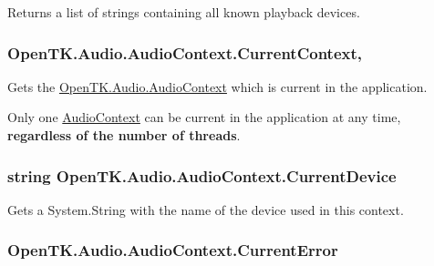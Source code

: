 Returns a list of strings containing all known playback devices. 

\hypertarget{class_open_t_k_1_1_audio_1_1_audio_context_a9dcc253ceab5ef47b59029df44f45423}{
\subsubsection[{Current\-Context}]{ Open\-T\-K.\-Audio.\-Audio\-Context.\-Current\-Context\hspace{0.3cm}{\ttfamily [static]}, {\ttfamily [get]}}}\label{class_open_t_k_1_1_audio_1_1_audio_context_a9dcc253ceab5ef47b59029df44f45423}


Gets the \hyperlink{class_open_t_k_1_1_audio_1_1_audio_context}{Open\-T\-K.\-Audio.\-Audio\-Context} which is current in the application. 

Only one \hyperlink{class_open_t_k_1_1_audio_1_1_audio_context}{Audio\-Context} can be current in the application at any time, {\bfseries regardless of the number of threads}. \hypertarget{class_open_t_k_1_1_audio_1_1_audio_context_ac7f2d8425e9afff0f9cca419792b1746}{
\subsubsection[{Current\-Device}]{\setlength{\rightskip}{0pt plus 5cm}string Open\-T\-K.\-Audio.\-Audio\-Context.\-Current\-Device\hspace{0.3cm}{\ttfamily [get]}}}\label{class_open_t_k_1_1_audio_1_1_audio_context_ac7f2d8425e9afff0f9cca419792b1746}


Gets a System.\-String with the name of the device used in this context. 

\hypertarget{class_open_t_k_1_1_audio_1_1_audio_context_a83bd17325ea568fb38e754eebd63b62f}{
\subsubsection[{Current\-Error}]{ Open\-T\-K.\-Audio.\-Audio\-Context.\-Current\-Error\hspace{0.3cm}{\ttfamily [get]}}}\label{class_open_t_k_1_1_audio_1_1_audio_context_a83bd17325ea568fb38e754eebd63b62f}



